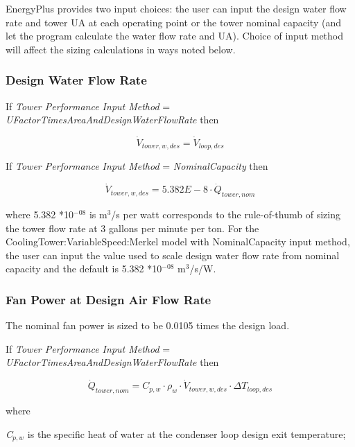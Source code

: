 EnergyPlus provides two input choices: the user can input the design water flow rate and tower UA at each operating point or the tower nominal capacity (and let the program calculate the water flow rate and UA). Choice of input method will affect the sizing calculations in ways noted below.

\subsubsection{Design Water Flow Rate}\label{design-water-flow-rate}

If \emph{Tower Performance Input Method} = \emph{UFactorTimesAreaAndDesignWaterFlowRate} then

\begin{equation}
\dot V_{tower,w,des} = \dot V_{loop,des}
\end{equation}

If \emph{Tower Performance Input Method} = \emph{NominalCapacity} then

\begin{equation}
\dot V_{tower,w,des} = 5.382E - 8\cdot \dot Q_{tower,nom}
\end{equation}

where 5.382 *10\(^{-08}\) is m\(^{3}\)/s per watt corresponds to the rule-of-thumb of sizing the tower flow rate at 3 gallons per minute per ton. For the CoolingTower:VariableSpeed:Merkel model with NominalCapacity input method, the user can input the value used to scale design water flow rate from nominal capacity and the default is 5.382 *10\(^{-08}\) m\(^{3}\)/s/W.

\subsubsection{Fan Power at Design Air Flow Rate}\label{fan-power-at-design-air-flow-rate}

The nominal fan power is sized to be 0.0105 times the design load.

If \emph{Tower Performance Input Method} = \emph{UFactorTimesAreaAndDesignWaterFlowRate} then

\begin{equation}
\dot Q_{tower,nom} = C_{p,w} \cdot \rho_{w} \cdot \dot V_{tower,w,des} \cdot \Delta T_{loop,des}
\end{equation}

where

\emph{C\(_{p,w}\)} is the specific heat of water at the condenser loop design exit temperature;

